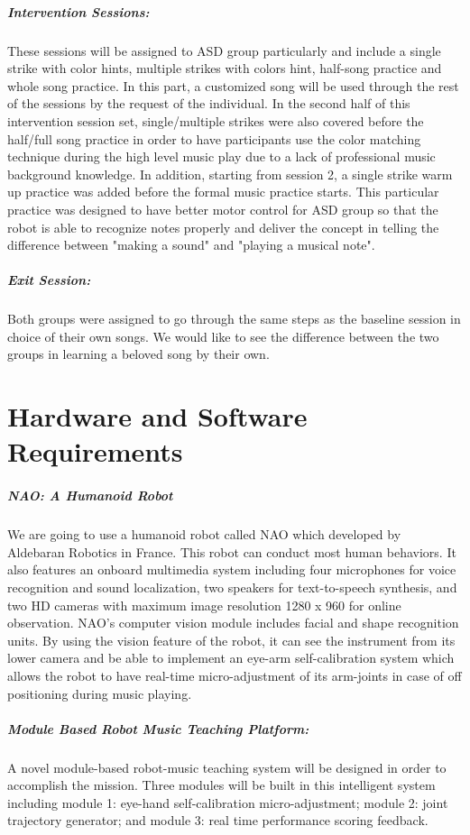 \documentclass[12pt]{report}
\begin{document}
\subparagraph{Intervention Sessions: }These sessions will be assigned to ASD group
particularly and include a single strike with color hints, multiple strikes with
colors hint, half-song practice and whole song practice. In this part, a customized 
song will be used through the rest of the sessions by the request of the individual. In the second
half of this intervention session set, single/multiple strikes were also covered
before the half/full song practice in order to have participants use the
color matching technique during the high level music play due to a lack of professional
music background knowledge. In addition, starting from session 2, a single strike
warm up practice was added before the formal music practice starts. This particular
practice was designed to have better motor control for ASD group so that
the robot is able to recognize notes properly and deliver the concept in telling the
difference between "making a sound" and "playing a musical note". \\

\subparagraph{Exit Session: }Both groups were assigned to go through the same steps
as the baseline session in choice of their own songs. We would like to see the 
difference between the two groups in learning a beloved song by their own.\\

\section*{Hardware and Software Requirements}
\subparagraph{NAO: A Humanoid Robot}
We are going to use a humanoid  robot called NAO which developed by Aldebaran Robotics in France. 
This robot can conduct most human behaviors. It also features an onboard multimedia 
system including four microphones for voice recognition and sound localization, 
two speakers for text-to-speech synthesis, and two HD cameras with maximum image 
resolution 1280 x 960 for online observation. NAO’s computer vision module includes 
facial and shape recognition units. By using the 
vision feature of the robot, it can see the instrument 
from its lower camera and be able to implement an eye-arm self-calibration 
system which allows the robot to have real-time micro-adjustment of its 
arm-joints in case of off positioning during music playing.\\

\subparagraph{Module Based Robot Music Teaching Platform:}A novel module-based robot-music 
teaching system will be designed in order to accomplish the mission. 
Three modules will be built in this intelligent system including module 1: eye-hand 
self-calibration micro-adjustment; module 2: joint trajectory generator; and 
module 3: real time performance scoring feedback.\\
\end{document}
